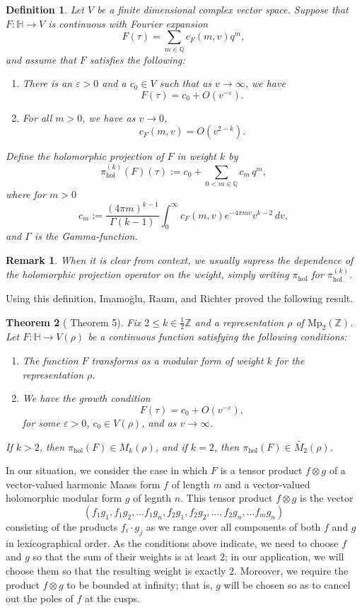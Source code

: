 \documentclass[11pt,reqno]{amsart}
\newtheorem{theorem}{Theorem}[section]
\newtheorem{definition}[theorem]{Definition}
\newcommand{\Z}{\mathbb{Z}}
\renewcommand{\=}{\;=\;}
\theoremstyle{myremark}
\newtheorem{remark}{Remark}
\begin{document}
\begin{definition}
\label{def:IRRdef}
Let $V$ be a finite dimensional complex vector space. Suppose that $F\colon\mathbb{H}\to V$ is continuous with Fourier expansion
\[
F(\tau)=\sum_{m\in\mathbb{Q}} c_F(m,v)q^m,
\]
and assume that $F$ satisfies the following:
\begin{enumerate}
\renewcommand{\labelenumi}{\textup{(\arabic{enumi})}}
\item There is an $\varepsilon>0$ and a
$c_0\in V$ such that as $v \to \infty$, we have
\[
F(\tau)
=
c_0
+
O\!\left(v^{-\varepsilon}\right).
\]
\item For all $m>0$, we have as $v\to0$,
\[
c_F(m,v)=O(v^{2-k}).
\]
\end{enumerate}
Define the holomorphic projection of $F$ in weight $k$ by
\[
\pi_{\mathrm{hol}}^{(k)}(F)(\tau)
:=
c_0
+
\sum_{0<m\in\mathbb{Q}} c_m\,q^m,
\]
where for $m>0$
\[
c_m
:=
\frac{(4\pi m)^{k-1}}{\Gamma(k-1)}
\int_0^\infty
c_F(m,v)e^{-4\pi mv}v^{k-2}\,dv,
\]
and $\Gamma$ is the Gamma-function.
\end{definition}
\begin{remark}
    When it is clear from context, we usually supress the dependence of the holomorphic projection operator on the weight, simply writing $\pi_{\mathrm{hol}}$ for $\pi_{\mathrm{hol}}^{(k)}$.
\end{remark}
Using this definition, Imamo\u{g}lu, Raum, and Richter proved the following result.
\begin{theorem}[\cite{IRR} Theorem 5]\label{MainHolProjThm}
Fix $2\leq k\in\frac12\Z$ and a representation $\rho$ of $\mathrm{Mp}_2(\Z)$. Let $F\colon \mathbb H\rightarrow V(\rho)$ be a continuous function satisfying the following conditions:
\begin{enumerate}
\renewcommand{\labelenumi}{\textup{(\arabic{enumi})}}
\item The function $F$ transforms as a modular form of weight $k$ for the representation $\rho$.
\item We have the growth condition
\[
F(\tau)=c_0+O\left(v^{-\varepsilon}\right),
\]
for some $\varepsilon>0$, $c_0\in V(\rho)$, and as $v\rightarrow\infty$. 
\end{enumerate}
If $k>2$, then $\pi_{\mathrm{hol}}(F)\in M_k(\rho)$, and if $k=2$, then $\pi_{\mathrm{hol}}(F)\in \widetilde{M_2}(\rho)$.
\end{theorem}

In our situation, we consider the case in which $F$ is a tensor product $f\otimes g$ of a vector-valued harmonic Maass form $f$ of length $m$ and a vector-valued holomorphic modular form $g$ of legnth $n$. 
This tensor product $f\otimes g$ is the vector 
\[
(f_1g_1, f_1g_2,\ldots f_1g_n,f_2g_1,f_2g_2,\ldots,f_2g_n,\ldots f_mg_n)
\]
consisting of the products $f_i\cdot g_j$ as we range over all components of both $f$ and $g$ in lexicographical order.
As the conditions above indicate, we need to choose $f$ and $g$ so that the sum of their weights is at least $2$; in our application, we will choose them so that the resulting weight is exactly $2$. 
Moreover, we require the product $f\otimes g$ to be bounded at infinity; that is, $g$ will be chosen so as to cancel out the poles of $f$ at the cusps.
\end{document}
